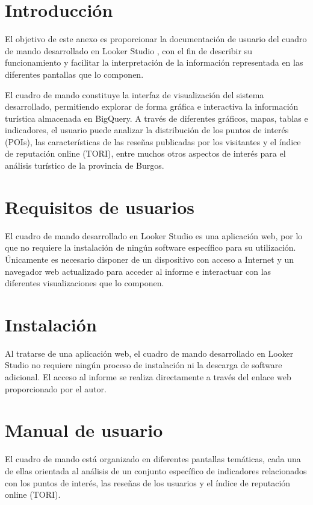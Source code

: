 
\section{Introducción}

El objetivo de este anexo es proporcionar la documentación de usuario del cuadro de mando desarrollado en Looker Studio \cite{looker_studio_dashboard}, con el fin de describir su funcionamiento y facilitar la interpretación de la información representada en las diferentes pantallas que lo componen.

El cuadro de mando constituye la interfaz de visualización del sistema desarrollado, permitiendo explorar de forma gráfica e interactiva la información turística almacenada en BigQuery. A través de diferentes gráficos, mapas, tablas e indicadores, el usuario puede analizar la distribución de los puntos de interés (POIs), las características de las reseñas publicadas por los visitantes y el índice de reputación online (TORI), entre muchos otros aspectos de interés para el análisis turístico de la provincia de Burgos.

\section{Requisitos de usuarios}

El cuadro de mando desarrollado en Looker Studio es una aplicación web, por lo que no requiere la instalación de ningún software específico para su utilización. Únicamente es necesario disponer de un dispositivo con acceso a Internet y un navegador web actualizado para acceder al informe e interactuar con las diferentes visualizaciones que lo componen.

\section{Instalación}

Al tratarse de una aplicación web, el cuadro de mando desarrollado en Looker Studio no requiere ningún proceso de instalación ni la descarga de software adicional. El acceso al informe se realiza directamente a través del enlace web proporcionado por el autor.

\section{Manual de usuario}

El cuadro de mando está organizado en diferentes pantallas temáticas, cada una de ellas orientada al análisis de un conjunto específico de indicadores relacionados con los puntos de interés, las reseñas de los usuarios y el índice de reputación online (TORI).

